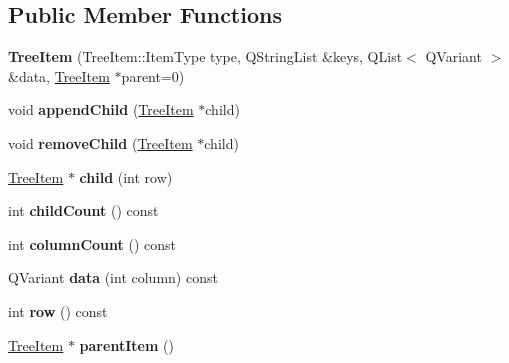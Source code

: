 \subsection*{Public Member Functions}
\begin{DoxyCompactItemize}
\item 
{\bfseries Tree\+Item} (Tree\+Item\+::\+Item\+Type type, Q\+String\+List \&keys, Q\+List$<$ Q\+Variant $>$ \&data, \hyperlink{class_tree_item}{Tree\+Item} $\ast$parent=0)\hypertarget{class_tree_item_a874485ee05b1a1e2bb67555c1edc1d43}{}\label{class_tree_item_a874485ee05b1a1e2bb67555c1edc1d43}

\item 
void {\bfseries append\+Child} (\hyperlink{class_tree_item}{Tree\+Item} $\ast$child)\hypertarget{class_tree_item_ac7f432ac0587ca037e80857eefd622f8}{}\label{class_tree_item_ac7f432ac0587ca037e80857eefd622f8}

\item 
void {\bfseries remove\+Child} (\hyperlink{class_tree_item}{Tree\+Item} $\ast$child)\hypertarget{class_tree_item_a82792044375f1a6f9e26e18690adc114}{}\label{class_tree_item_a82792044375f1a6f9e26e18690adc114}

\item 
\hyperlink{class_tree_item}{Tree\+Item} $\ast$ {\bfseries child} (int row)\hypertarget{class_tree_item_a80ab3164e41c8a43f1a9ef7255d88249}{}\label{class_tree_item_a80ab3164e41c8a43f1a9ef7255d88249}

\item 
int {\bfseries child\+Count} () const \hypertarget{class_tree_item_a55ffe6dd27750e479034b93e753f87af}{}\label{class_tree_item_a55ffe6dd27750e479034b93e753f87af}

\item 
int {\bfseries column\+Count} () const \hypertarget{class_tree_item_a31c3fb89ad8e19ae696a310a1f843a8e}{}\label{class_tree_item_a31c3fb89ad8e19ae696a310a1f843a8e}

\item 
Q\+Variant {\bfseries data} (int column) const \hypertarget{class_tree_item_a16641e42c78f004d47a66f3b2c39341f}{}\label{class_tree_item_a16641e42c78f004d47a66f3b2c39341f}

\item 
int {\bfseries row} () const \hypertarget{class_tree_item_a5a062d24b35421360ad1d101c564e9be}{}\label{class_tree_item_a5a062d24b35421360ad1d101c564e9be}

\item 
\hyperlink{class_tree_item}{Tree\+Item} $\ast$ {\bfseries parent\+Item} ()\hypertarget{class_tree_item_ab9f8fe7c9bd0c14efa37a91dea40543b}{}\label{class_tree_item_ab9f8fe7c9bd0c14efa37a91dea40543b}


\end{DoxyCompactItemize}
